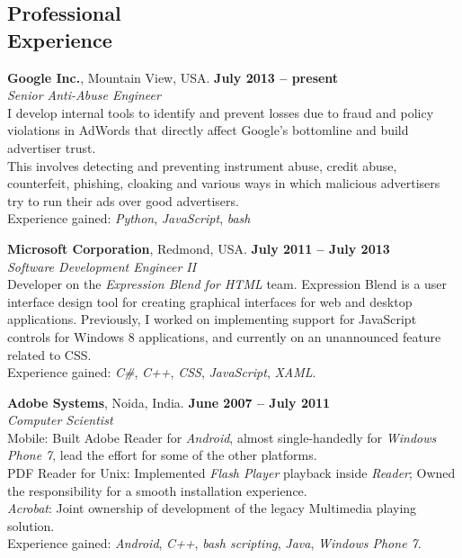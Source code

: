 \documentclass[margin,line]{resume}
\begin{document}
\begin{resume}
	\section{\mysidestyle Professional\\Experience}

	\textbf{Google Inc.}, Mountain View, USA. \hfill \textbf{July 2013 -- present}\vspace{2mm}\\\vspace{1mm}%
	\textsl{Senior Anti-Abuse Engineer}\\
  I develop internal tools to identify and prevent losses due to fraud and policy violations in AdWords that directly affect Google's bottomline and build advertiser trust.\\
	This involves detecting and preventing instrument abuse, credit abuse, counterfeit, phishing, cloaking and various ways in which malicious advertisers try to run their ads over good advertisers.\\
	Experience gained: \textit{Python}, \textit{JavaScript}, \textit{bash}

	\textbf{Microsoft Corporation}, Redmond, USA. \hfill \textbf{July 2011 -- July 2013}\vspace{2mm}\\\vspace{1mm}%
	\textsl{Software Development Engineer II}\\
	Developer on the \textit{Expression Blend for HTML} team. Expression Blend is a user interface design tool for creating graphical interfaces for web and desktop applications. Previously, I worked on implementing support for JavaScript controls for Windows 8 applications, and currently on an unannounced feature related to CSS.\\
	Experience gained: \textit{C\#}, \textit{C++}, \textit{CSS}, \textit{JavaScript}, \textit{XAML}.

	\textbf{Adobe Systems}, Noida, India. \hfill \textbf{June 2007 -- July 2011}\vspace{2mm}\\\vspace{1mm}%
	\textsl{Computer Scientist}\\
	Mobile: Built Adobe Reader for \textit{Android}, almost single-handedly for \textit{Windows Phone 7}, lead the effort for some of the other platforms.\\
	PDF Reader for Unix: Implemented \textit{Flash Player} playback inside \textit{Reader}; Owned the responsibility for a smooth installation experience.\\
	\textit{Acrobat}: Joint ownership of development of the legacy Multimedia playing solution.\\
	Experience gained: \textit{Android}, \textit{C++}, \textit{bash scripting}, \textit{Java}, \textit{Windows Phone 7}.


\end{resume}
\end{document}
